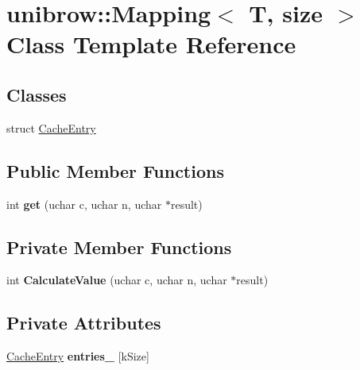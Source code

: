 \hypertarget{classunibrow_1_1_mapping}{}\section{unibrow\+:\+:Mapping$<$ T, size $>$ Class Template Reference}
\label{classunibrow_1_1_mapping}
\subsection*{Classes}
\begin{DoxyCompactItemize}
\item 
struct \hyperlink{structunibrow_1_1_mapping_1_1_cache_entry}{Cache\+Entry}
\end{DoxyCompactItemize}
\subsection*{Public Member Functions}
\begin{DoxyCompactItemize}
\item 
int {\bfseries get} (uchar c, uchar n, uchar $\ast$result)\hypertarget{classunibrow_1_1_mapping_af188d9e55a5717b581e026969b33cd38}{}\label{classunibrow_1_1_mapping_af188d9e55a5717b581e026969b33cd38}

\end{DoxyCompactItemize}
\subsection*{Private Member Functions}
\begin{DoxyCompactItemize}
\item 
int {\bfseries Calculate\+Value} (uchar c, uchar n, uchar $\ast$result)\hypertarget{classunibrow_1_1_mapping_a7a6b2ecfb5bc65621f903e9ac64d7730}{}\label{classunibrow_1_1_mapping_a7a6b2ecfb5bc65621f903e9ac64d7730}

\end{DoxyCompactItemize}
\subsection*{Private Attributes}
\begin{DoxyCompactItemize}
\item 
\hyperlink{structunibrow_1_1_mapping_1_1_cache_entry}{Cache\+Entry} {\bfseries entries\+\_\+} \mbox{[}k\+Size\mbox{]}\hypertarget{classunibrow_1_1_mapping_a945a6ba8cc8151cf6fe7743a44b2c8ef}{}\label{classunibrow_1_1_mapping_a945a6ba8cc8151cf6fe7743a44b2c8ef}

\end{DoxyCompactItemize}
